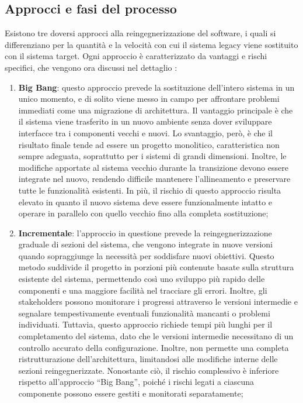 \subsection{Approcci e fasi del processo}\label{sez:reingegnerizzazione-approcci-fasi}
Esistono tre doversi approcci alla reingegnerizzazione del software, i quali si differenziano per la quantità e la velocità con cui il sistema legacy viene sostituito con il sistema target. Ogni approccio è caratterizzato da vantaggi e rischi specifici, che vengono ora discussi nel dettaglio \cite{Majthoub2018,rosenberg1996software}:
\begin{enumerate}
  \item \textbf{Big Bang}: questo approccio prevede la sostituzione dell'intero sistema in un unico momento, e di solito viene messo in campo per affrontare problemi immediati come una migrazione di architettura. Il vantaggio principale è che il sistema viene trasferito in un nuovo ambiente senza dover sviluppare interfacce tra i componenti vecchi e nuovi. Lo svantaggio, però, è che il risultato finale tende ad essere un progetto monolitico, caratteristica non sempre adeguata, soprattutto per i sistemi di grandi dimensioni. Inoltre, le modifiche apportate al sistema vecchio durante la transizione devono essere integrate nel nuovo, rendendo difficile mantenere l'allineamento e preservare tutte le funzionalità esistenti. In più, il rischio di questo approccio risulta elevato in quanto il nuovo sistema deve essere funzionalmente intatto e operare in parallelo con quello vecchio fino alla completa sostituzione;

  \item \textbf{Incrementale}: l'approccio in questione prevede la reingegnerizzazione graduale di sezioni del sistema, che vengono integrate in nuove versioni quando sopraggiunge la necessità per soddisfare nuovi obiettivi. Questo metodo suddivide il progetto in porzioni più contenute basate sulla struttura esistente del sistema, permettendo così uno sviluppo più rapido delle componenti e una maggiore facilità nel tracciare gli errori. Inoltre, gli stakeholders possono monitorare i progressi attraverso le versioni intermedie e segnalare tempestivamente eventuali funzionalità mancanti o problemi individuati. Tuttavia, questo approccio richiede tempi più lunghi per il completamento del sistema, dato che le versioni intermedie necessitano di un controllo accurato della configurazione. Inoltre, non permette una completa ristrutturazione dell'architettura, limitandosi alle modifiche interne delle sezioni reingegnerizzate. Nonostante ciò, il rischio complessivo è inferiore rispetto all'approccio ``Big Bang'', poiché i rischi legati a ciascuna componente possono essere gestiti e monitorati separatamente;


\end{enumerate}
